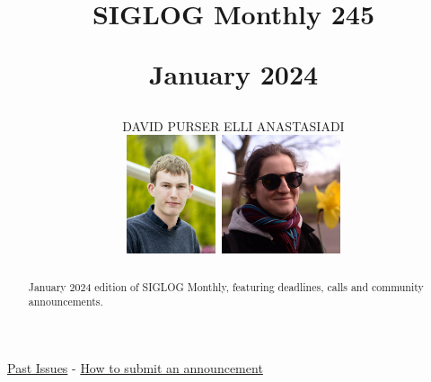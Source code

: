 \documentclass[prodmode,acmtecs]{acmsmall} %
\newcounter{colstart}
\begin{document}
\setcounter{colstart}{\thepage}

\title{{\huge\sc SIGLOG Monthly 245}

 January 2024}
\author{DAVID PURSER
ELLI ANASTASIADI
\vspace*{-2.6cm}\begin{flushright}\includegraphics[height=35mm]{dp}\ \includegraphics[height=35mm]{ea}\end{flushright}
}



\begin{abstract}
January 2024 edition of SIGLOG Monthly, featuring deadlines, calls and community announcements.
\end{abstract}


\maketitlee

\href{https://lics.siglog.org/newsletters/}{Past Issues}
 - 
\href{https://lics.siglog.org/newsletters/inst.html}{How to submit an announcement}
\end{document}
